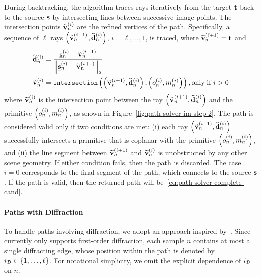 During backtracking, the algorithm traces rays iteratively from the target $\mathbf{t}$ back to the source $\mathbf{s}$ by intersecting lines between successive image points.
The intersection points $\widetilde{\mathbf{v}}_n^{(i)}$ are the refined vertices of the path.
Specifically, a sequence of $\ell$ rays $\left( \widetilde{\mathbf{v}}_n^{(i+1)}, \widehat{\mathbf{d}}_n^{(i)}\right)$, $i = \ell, \dots, 1$, is traced, where $\widetilde{\mathbf{v}}_n^{(\ell+1)} = \mathbf{t}$ and
\begin{equation}
    \label{eq:path-solver-im-backtracking}
    \begin{aligned}
        \widehat{\mathbf{d}}_n^{(i)} &= \frac{\underline{\mathbf{s}}_n^{(i)} - \widetilde{\mathbf{v}}_n^{(i+1)}}{\left\lVert\underline{\mathbf{s}}_n^{(i)} - \widetilde{\mathbf{v}}_n^{(i+1)}\right\rVert_2}\\
        \widetilde{\mathbf{v}}_n^{(i)} &= \texttt{intersection}\left(\left( \widetilde{\mathbf{v}}_n^{(i+1)}, \widehat{\mathbf{d}}_n^{(i)} \right), \left( o_n^{(i)}, m_n^{(i)} \right)\right), \text{only if } i > 0
    \end{aligned}
\end{equation}
where $\widetilde{\mathbf{v}}_n^{(i)}$ is the intersection point between the ray $\left( \widetilde{\mathbf{v}}_n^{(i+1)}, \widehat{\mathbf{d}}_n^{(i)} \right)$ and the primitive $\left( o_n^{(i)}, m_n^{(i)} \right)$, as shown in Figure~\ref{fig:path-solver-im-step-2}.
The path is considered valid only if two conditions are met: (i) each ray $\left( \widetilde{\mathbf{v}}_n^{(i+1)}, \widehat{\mathbf{d}}_n^{(i)} \right)$ successfully intersects a primitive that is coplanar with the primitive $\left( o_n^{(i)}, m_n^{(i)} \right)$, and (ii) the line segment between $\widetilde{\mathbf{v}}_n^{(i+1)}$ and $\widetilde{\mathbf{v}}_n^{(i)}$ is unobstructed by any other scene geometry. If either condition fails, then the path is discarded.
The case $i = 0$ corresponds to the final segment of the path, which connects to the source $\mathbf{s}$.
If the path is valid, then the returned path will be~\eqref{eq:path-solver-complete-cand}.

\paragraph{Paths with Diffraction}
To handle paths involving diffraction, we adopt an approach inspired by~\cite{6815738}. Since \SRT{} currently only supports first-order diffraction, each sample $n$ contains at most a single diffracting edge, whose position within the path is denoted by $i_{{\cal D}} \in \left\{ 1, \dots, \ell \right\}$. For notational simplicity, we omit the explicit dependence of $i_{{\cal D}}$ on $n$.

